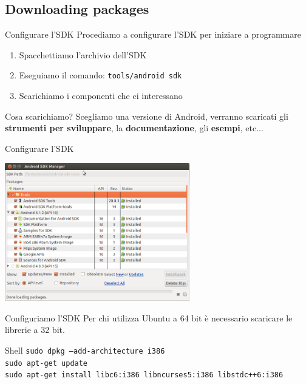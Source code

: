 \documentclass[xcolor=svgnames,11pt]{beamer}
\begin{document}
\subsection{Downloading packages}
\begin{frame}{Configurare l'SDK}
Procediamo a configurare l'SDK per iniziare a programmare
\pause
	\begin{enumerate}
		\item Spacchettiamo l'archivio dell'SDK
		\pause
		\item Eseguiamo il comando: \texttt{tools/android sdk}
		\pause
		\item Scarichiamo i componenti che ci interessano
	\end{enumerate}
\pause
\medskip
\begin{block}{Cosa scarichiamo?}
Scegliamo una versione di Android, verranno scaricati gli \textbf{strumenti per sviluppare}, la \textbf{documentazione}, gli \textbf{esempi}, etc...
\end{block}
\end{frame}

\begin{frame}{Configurare l'SDK}
\begin{center}
\includegraphics[height=6cm]{manage.png}
\end{center}
\end{frame}

\begin{frame}{Configuriamo l'SDK}
Per chi utilizza Ubuntu a 64 bit \`e necessario scaricare le librerie a 32 bit.
\pause
\medskip
\begin{block}{Shell}
\texttt{sudo dpkg --add-architecture i386}\\
\texttt{sudo apt-get update}\\
\texttt{sudo apt-get install libc6:i386 libncurses5:i386 libstdc++6:i386}
\end{block}
\end{frame}
\end{document}

